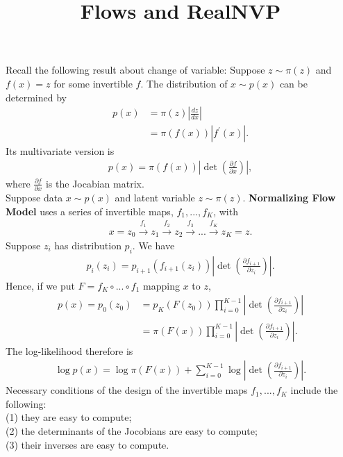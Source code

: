 \documentclass[12pt,oneside]{article}
\title{Flows and RealNVP}
\date{} %
\newcommand{\ali}[1]{\begin{align*}#1\end{align*}}
\theoremstyle{plain}
\theoremstyle{remark}
\begin{document}
\onehalfspace

\sloppy
\maketitle
Recall the following result about change of variable: Suppose $z \sim \pi(z)$ and $f(x) = z$ for some invertible $f$. The distribution of $x \sim p(x)$ can be determined by 
\ali{p(x) &= \pi(z) \left|\frac{dz}{dx}\right| \\
          &= \pi(f(x)) | f^{'} (x) |.}
Its multivariate version is 
\ali{p(x) =  \pi(f(x)) \left| \det \left( \frac{\partial f}{\partial x} \right) \right|,}
where $\frac{\partial f}{\partial x}$ is the Jocabian matrix.\\
Suppose data $x \sim p(x)$ and latent variable $z \sim \pi(z)$. {\bf Normalizing Flow Model} uses a series of invertible maps, $f_1, ..., f_K$, with
\ali{x = z_0 \xrightarrow{f_1} z_1 \xrightarrow{f_2} z_2 \xrightarrow{f_3} ... \xrightarrow{f_K} z_K = z.}  
Suppose $z_i$ has distribution $p_i$. We have
\ali{p_i(z_i) = p_{i+1}(f_{i+1}(z_i)) \left| \det \left( \frac{\partial f_{i+1}}{\partial z_i} \right) \right|.}
Hence, if we put $F = f_K \circ ... \circ f_1$ mapping $x$ to $z$,
\ali{p(x) = p_0(z_0) &= p_K(F(z_0)) \prod_{i=0}^{K-1}  \left| \det \left( \frac{\partial f_{i+1}}{\partial z_i} \right) \right| \\
                    &= \pi(F(x)) \prod_{i=0}^{K-1}  \left| \det \left( \frac{\partial f_{i+1}}{\partial z_i} \right) \right|.}
The log-likelihood therefore is
\ali{\log p(x) = \log \pi(F(x)) + \sum_{i=0}^{K-1} \log \left| \det \left( \frac{\partial f_{i+1}}{\partial z_i} \right) \right|.}
Necessary conditions of the design of the invertible maps $f_1, ..., f_K$ include the following:\\
(1) they are easy to compute;\\
(2) the determinants of the Jocobians are easy to compute;\\
(3) their inverses are easy to compute.\\
\end{document}
